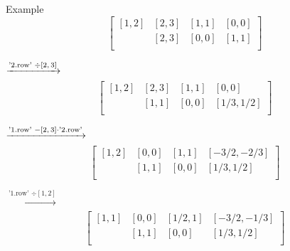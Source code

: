 \documentclass[german,10pt,xcolor=colortbl,compress]{beamer}
\begin{document}
\begin{frame}{Example}
\[
    \left[
    \begin{array}{cc|cc}
    [1,2]&[2,3]&[1,1]&[0,0]  \\

    [0,0]&[2,3]&[0,0]&[1,1]  \\
    \end{array}
    \right]
    \]

    \pause

    $\xrightarrow[\text{}]{\text{'2.row' $ \div  [2,3]$}}$
    \[
    \left[
    \begin{array}{cc|cc}
    [1,2]&[2,3]&[1,1]&[0,0]  \\

    [0,0]&[1,1]&[0,0]&[1/3,1/2]  \\
    \end{array}
    \right]
    \]

    \pause

    $\xrightarrow[\text{}]{\text{'1.row' $ - [2,3]\cdot$'2.row'}}$
    \[
    \left[
    \begin{array}{cc|cc}
    [1,2]&[0,0]&[1,1]&[-3/2,-2/3]  \\

    [0,0]&[1,1]&[0,0]&[1/3,1/2]  \\
    \end{array}
    \right]
    \]

    \pause

    $\xrightarrow[\text{}]{\text{'1.row' $\div  [1,2]$}}$
    \[
    \left[
    \begin{array}{cc|cc}
    [1,1]&[0,0]&[1/2,1]&[-3/2,-1/3]  \\

    [0,0]&[1,1]&[0,0]&[1/3,1/2]  \\
    \end{array}
    \right]
    \]
\end{frame}
\end{document}
